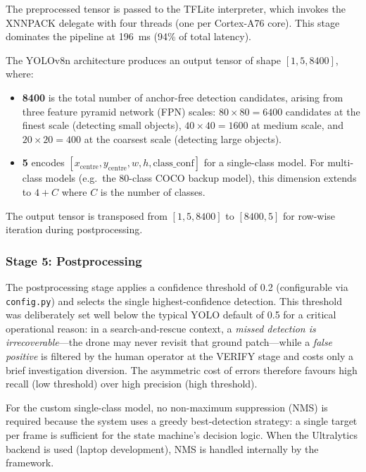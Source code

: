 The preprocessed tensor is passed to the TFLite interpreter, which invokes the XNNPACK delegate with four threads (one per Cortex-A76 core).  This stage dominates the pipeline at \SI{196}{\milli\second} (94\% of total latency).

The YOLOv8n architecture produces an output tensor of shape $[1, 5, 8400]$, where:
\begin{itemize}
    \item \textbf{8400} is the total number of anchor-free detection candidates, arising from three feature pyramid network (FPN) scales: $80 \times 80 = 6400$ candidates at the finest scale (detecting small objects), $40 \times 40 = 1600$ at medium scale, and $20 \times 20 = 400$ at the coarsest scale (detecting large objects).
    \item \textbf{5} encodes $[x_\mathrm{centre}, y_\mathrm{centre}, w, h, \mathrm{class\_conf}]$ for a single-class model.  For multi-class models (e.g.\ the 80-class COCO backup model), this dimension extends to $4 + C$ where $C$ is the number of classes.
\end{itemize}

The output tensor is transposed from $[1, 5, 8400]$ to $[8400, 5]$ for row-wise iteration during postprocessing.

\subsubsection{Stage 5: Postprocessing}

The postprocessing stage applies a confidence threshold of 0.2 (configurable via \texttt{config.py}) and selects the single highest-confidence detection.  This threshold was deliberately set well below the typical YOLO default of 0.5 for a critical operational reason: in a search-and-rescue context, a \emph{missed detection is irrecoverable}---the drone may never revisit that ground patch---while a \emph{false positive} is filtered by the human operator at the VERIFY stage and costs only a brief investigation diversion.  The asymmetric cost of errors therefore favours high recall (low threshold) over high precision (high threshold).

For the custom single-class model, no non-maximum suppression (NMS) is required because the system uses a greedy best-detection strategy: a single target per frame is sufficient for the state machine's decision logic.  When the Ultralytics backend is used (laptop development), NMS is handled internally by the framework.

